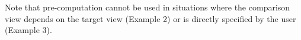   Note that pre-computation cannot be used in situations where the comparison
  view depends on the target view (Example 2) or is directly specified by the
  user (Example 3).






